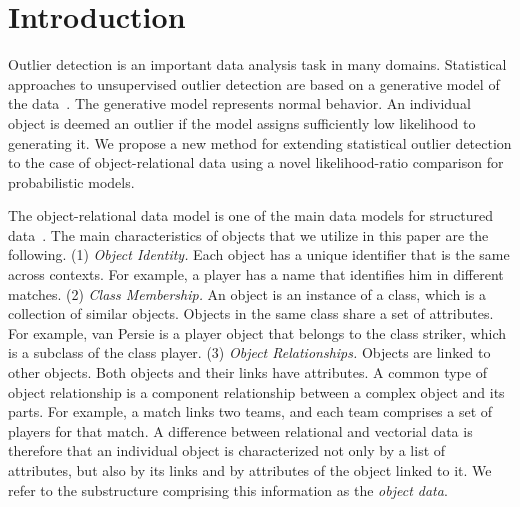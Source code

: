 \documentclass[conference]{IEEEtran}
\begin{document}




%
\IEEEpeerreviewmaketitle



\section{Introduction} 
Outlier detection is an important data analysis task in many domains. Statistical approaches to unsupervised outlier detection are based on a generative model of the data~\cite{aggarwal2013}. The generative model represents normal behavior. An individual object is deemed an outlier if  the model assigns sufficiently low likelihood to generating it. 
We propose a new method for extending statistical  outlier detection to the case of object-relational data using a novel likelihood-ratio comparison for probabilistic models. 

The object-relational data model is one of the main data models for structured data~\cite{Koller1997}. The main 
characteristics of objects that we utilize in this paper are the following. (1) {\em Object Identity.} Each object has a unique identifier that is the same across contexts. For example, a player has a name that identifies him in different matches. (2) {\em Class Membership.} An object is an instance of a class, which is a collection of similar objects. Objects in the same class share a set of attributes. For example, van Persie is a player object that belongs to the class striker, which is a subclass of the  class player. (3) {\em Object Relationships.} Objects are linked  to other objects. Both objects and their links have attributes. A common type of object relationship is a component relationship between a complex object and its parts.
For example, a match links two teams, and each team comprises a set of players for that match. A difference between relational and vectorial data is therefore that an individual object is characterized not only by a list of attributes, but also by its links and by attributes of the object linked to it. We refer to the substructure comprising this information as the {\em object data}.
\end{document}
